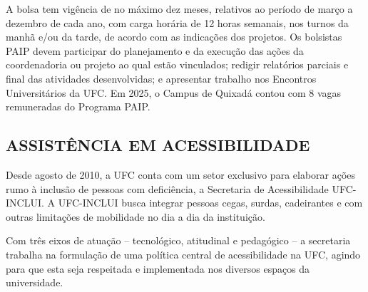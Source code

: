 A bolsa tem vigência de no máximo dez meses, relativos ao período de março a dezembro de cada ano, com carga horária de 12 horas semanais, nos turnos da manhã e/ou da tarde, de acordo com as indicações dos projetos. Os bolsistas PAIP devem participar do planejamento e da execução das ações da coordenadoria ou projeto ao qual estão vinculados; redigir relatórios parciais e final das atividades desenvolvidas; e apresentar trabalho nos Encontros Universitários da UFC. Em 2025, o Campus de Quixadá contou com 8 vagas remuneradas do Programa PAIP. 




\subsection{ASSISTÊNCIA EM ACESSIBILIDADE} 
\label{sec:AssistenciaEmAcessibilidade}


Desde agosto de 2010, a UFC conta com um setor exclusivo para elaborar ações rumo à inclusão de pessoas com deficiência, a Secretaria de Acessibilidade UFC-INCLUI. A UFC-INCLUI busca integrar pessoas cegas, surdas, cadeirantes e com outras limitações de mobilidade no dia a dia da instituição.


Com três eixos de atuação – tecnológico, atitudinal e pedagógico – a secretaria trabalha na formulação de uma política central de acessibilidade na UFC, agindo para que esta seja respeitada e implementada nos diversos espaços da universidade.





